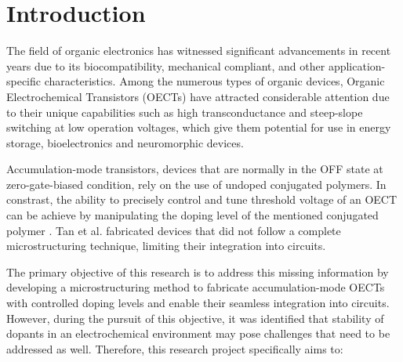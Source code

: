 \chapter{Introduction}
\label{cha:intro}

The field of organic electronics has witnessed significant advancements in recent years due to its biocompatibility, mechanical compliant, and other application-specific characteristics. Among the numerous types of organic devices, Organic Electrochemical Transistors (OECTs) have attracted considerable attention due to their unique capabilities such as high transconductance and steep-slope switching at low operation voltages, which give them potential for use in energy storage, bioelectronics and neuromorphic devices. 

Accumulation-mode transistors, devices that are normally in the OFF state at zero-gate-biased condition, rely on the use of undoped conjugated polymers. In constrast, the ability to precisely control and tune threshold voltage of an OECT can be achieve by manipulating the doping level of the mentioned conjugated polymer \cite{tan_tuning_2022}. Tan et al. fabricated devices that did not follow a complete microstructuring technique, limiting their integration into circuits. 



The primary objective of this research is to address this missing information by developing a microstructuring method to fabricate accumulation-mode OECTs with controlled doping levels and enable their seamless integration into circuits. However, during the pursuit of this objective, it was identified that stability of dopants in an electrochemical environment may pose challenges that need to be addressed as well. Therefore, this research project specifically aims to:

